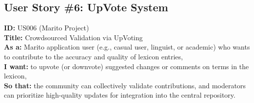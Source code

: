 \documentclass[12pt]{article}
\begin{document}
\subsection{User Story \#6: UpVote System}

\textbf{ID:} US006 (Marito Project) \\
\textbf{Title:} Crowdsourced Validation via UpVoting \\
\textbf{As a:} Marito application user (e.g., casual user, linguist, or academic) who wants to contribute to the accuracy and quality of lexicon entries, \\
\textbf{I want:} to upvote (or downvote) suggested changes or comments on terms in the lexicon, \\
\textbf{So that:} the community can collectively validate contributions, and moderators can prioritize high-quality updates for integration into the central repository.
\end{document}
